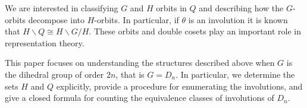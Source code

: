 \documentclass[12pt]{amsart}
\numberwithin{equation}{section}
\theoremstyle{definition}
\newcommand{\Aut}{\operatorname{Aut}}
\newcommand{\F}{\mathbb{F}}
\renewcommand{\ker}{\operatorname{ker}}
\begin{document}
We are interested in classifying $G$ and $H$ orbits in $Q$ and describing how the $G$-orbits decompose into $H$-orbits. In particular, if $\theta$ is an involution it is known that $H\backslash Q\cong H\backslash G/H$. These orbits and double cosets  play an important role in representation theory. 


%
%

This paper focuses on understanding the structures described above when $G$ is the dihedral group of order $2n$, that is $G=D_n$. 
In particular, we determine the sets $H$ and $Q$ explicitly, provide a procedure for enumerating the involutions, and give a closed formula for counting the equivalence classes of involutions of $D_n$.
\end{document}
